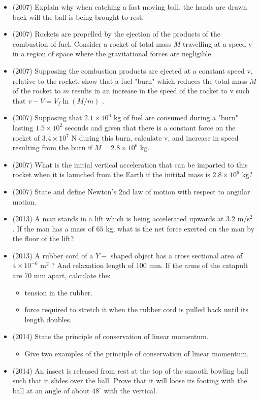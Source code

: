 \documentclass{article}
\begin{document}
\begin{itemize}
\item (2007)  Explain why when catching a fast moving ball, the hands are drawn back will the ball is being brought to rest.
\item (2007)  Rockets are propelled by the ejection of the products of the combustion of fuel.  Consider a rocket of total mass $ M$ travelling at a speed v in a region of space where the gravitational forces are negligible.  
\item (2007)  Supposing the combustion products are ejected at a constant speed v, relative to the rocket, show that a fuel "burn" which reduces the total mass $ M$ of the rocket to $ m$ results in an increase in the speed of the rocket to v such that $ v-V=V_{f} \ln (M/m)$ .
\item (2007)  Supposing that $ 2.1\times10^{6}$ kg of fuel are consumed during a "burn" lasting $ 1.5\times10^{2}$ seconds and given that there is a constant force on the rocket of $ 3.4\times 10^{7}$ N during this burn, calculate v, and increase in speed resulting from the burn if $ M=2.8\times10^{6}$ kg.  
\item (2007)  What is the initial vertical acceleration that can be imparted to this rocket when it is launched from the Earth if the initital mass is $ 2.8\times 10^{6}$ kg?
\item (2007)  State and define Newton’s 2nd law of motion with respect to angular motion. 
\item (2013)  A man stands in a lift which is being accelerated upwards at $ 3.2$ m$/$s$ ^{2}$ . If the man has a mass of $ 65$ kg, what is the net force exerted on the man by the floor of the lift?
\item (2013)  A rubber cord of a $ Y-$ shaped object has a cross sectional area of $ 4 \times 10^{-6}$ m$ ^{2}$ ? And relaxation length of $ 100$ mm. If the arms of the catapult are $ 70$ mm apart, calculate the: \begin{itemize}
\item tension in the rubber. 
\item force required to stretch it when the rubber cord is pulled back until its length doubles. 
\end{itemize}
\item (2014)  State the principle of conservation of linear momentum. \begin{itemize}
\item Give two examples of the principle of conservation of linear momentum. 
\end{itemize}
\item (2014)  An insect is released from rest at the top of the smooth bowling ball such that it slides over the ball. Prove that it will loose its footing with the ball at an angle of about $ 48^{\circ}$ with the vertical.

\end{itemize}
\end{document}
